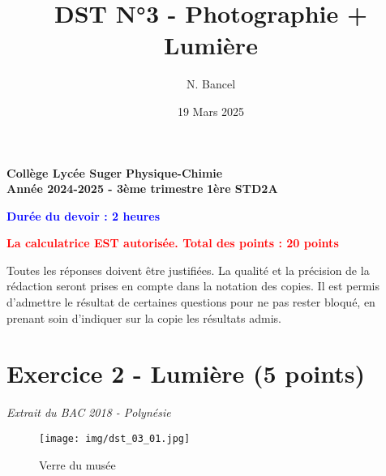 \documentclass[answers]{exam}
\title{DST N°3 - Photographie + Lumière}
\author{N. Bancel}
\date{19 Mars 2025}
\begin{document}
\textbf{Collège Lycée Suger}
\hfill
\textbf{Physique-Chimie} \\

\textbf{Année 2024-2025 - 3ème trimestre}
\hfill
\textbf{1ère STD2A} \par

{\let\newpage\relax\maketitle}


\begin{center}
  \textbf{\textcolor{blue}{Durée du devoir : 2 heures}} \par
  \vspace{1em}
  \textbf{\textcolor{red}{La calculatrice EST autorisée. Total des points : 20 points}} \par
  \vspace{1em}
\end{center}

\begin{tcolorbox}[colback=gray!10!white, colframe=gray, title=Note importante]
  \itshape{Toutes les réponses doivent être justifiées.
  La qualité et la précision de la rédaction seront prises en compte dans la notation des copies.
  Il est permis d'admettre le résultat de certaines questions pour ne pas rester bloqué, en prenant soin d'indiquer sur la copie les résultats admis. \par
  }
\end{tcolorbox}

\section*{Exercice 2 - Lumière (5 points)}

\textit{Extrait du BAC 2018 - Polynésie}

\begin{figure}[H]
  \centering
  \texttt{[image: img/dst\_03\_01.jpg]}
  \caption{Verre du musée}
  \label{fig:bioluminescence}
\end{figure}
\end{document}

